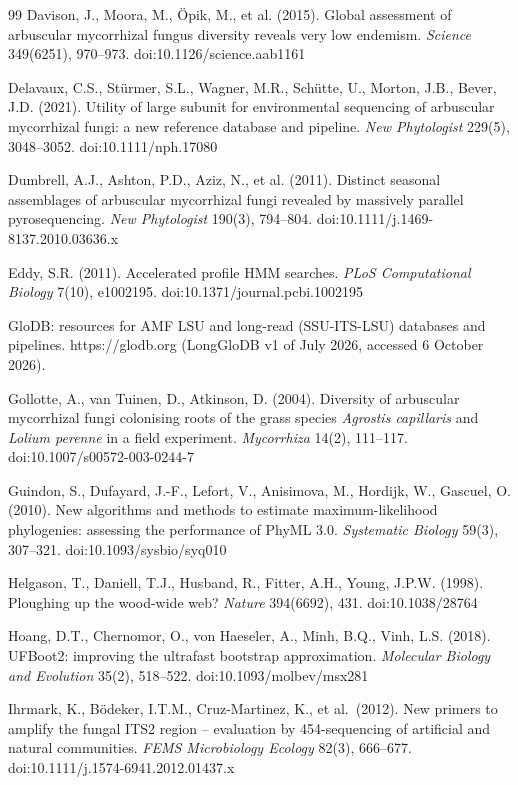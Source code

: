 \documentclass[11pt]{article}
\begin{document}
\begin{thebibliography}{99}
Davison, J., Moora, M., \"Opik, M., et al. (2015). Global assessment of arbuscular mycorrhizal fungus diversity
reveals very low endemism. \emph{Science} 349(6251), 970--973. doi:10.1126/science.aab1161

Delavaux, C.S., St\"urmer, S.L., Wagner, M.R., Sch\"utte, U., Morton, J.B., Bever, J.D.
(2021). Utility of large subunit for environmental sequencing of arbuscular mycorrhizal
fungi: a new reference database and pipeline. \emph{New Phytologist} 229(5), 3048--3052.
doi:10.1111/nph.17080

Dumbrell, A.J., Ashton, P.D., Aziz, N., et al. (2011). Distinct seasonal assemblages of
arbuscular mycorrhizal fungi revealed by massively parallel pyrosequencing.
\emph{New Phytologist} 190(3), 794--804. doi:10.1111/j.1469-8137.2010.03636.x

Eddy, S.R. (2011). Accelerated profile HMM searches. \emph{PLoS Computational Biology}
7(10), e1002195. doi:10.1371/journal.pcbi.1002195

GloDB: resources for AMF LSU and long-read (SSU-ITS-LSU) databases and pipelines. https://glodb.org
(LongGloDB v1 of July 2026, accessed 6 October 2026).

Gollotte, A., van Tuinen, D., Atkinson, D. (2004). Diversity of arbuscular mycorrhizal fungi
colonising roots of the grass species \emph{Agrostis capillaris} and \emph{Lolium perenne} in
a field experiment. \emph{Mycorrhiza} 14(2), 111--117. doi:10.1007/s00572-003-0244-7

Guindon, S., Dufayard, J.-F., Lefort, V., Anisimova, M., Hordijk, W., Gascuel, O. (2010). New algorithms and
methods to estimate maximum-likelihood phylogenies: assessing the performance of PhyML 3.0.
\emph{Systematic Biology} 59(3), 307--321. doi:10.1093/sysbio/syq010

Helgason, T., Daniell, T.J., Husband, R., Fitter, A.H., Young, J.P.W. (1998). Ploughing up the
wood-wide web? \emph{Nature} 394(6692), 431. doi:10.1038/28764

Hoang, D.T., Chernomor, O., von Haeseler, A., Minh, B.Q., Vinh, L.S. (2018). UFBoot2: improving the ultrafast
bootstrap approximation. \emph{Molecular Biology and Evolution} 35(2), 518--522. doi:10.1093/molbev/msx281

Ihrmark, K., B\"odeker, I.T.M., Cruz-Martinez, K., et al.\ (2012). New primers to amplify the fungal ITS2 region
-- evaluation by 454-sequencing of artificial and natural communities. \emph{FEMS Microbiology Ecology} 82(3),
666--677. doi:10.1111/j.1574-6941.2012.01437.x


\end{thebibliography}
\end{document}
